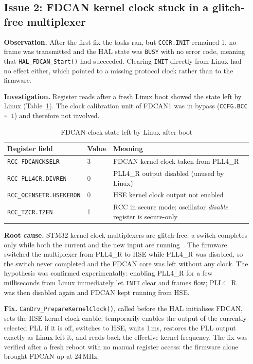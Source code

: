 \subsection{Issue 2: FDCAN kernel clock stuck in a glitch-free multiplexer}

\textbf{Observation.} After the first fix the tasks ran, but \texttt{CCCR.INIT} remained 1, no frame was transmitted and the HAL state was \texttt{BUSY} with no error code, meaning that \texttt{HAL\_FDCAN\_Start()} had succeeded. Clearing \texttt{INIT} directly from Linux had no effect either, which pointed to a missing protocol clock rather than to the firmware.

\textbf{Investigation.} Register reads after a fresh Linux boot showed the state left by Linux (Table~\ref{tab:clockstate}). The clock calibration unit of FDCAN1 was in bypass (\texttt{CCFG.BCC = 1}) and therefore not involved.

\begin{table}[H]
\centering
\small
\caption{FDCAN clock state left by Linux after boot}
\label{tab:clockstate}
\begin{tabularx}{\textwidth}{@{}llX@{}}
\toprule
\textbf{Register field} & \textbf{Value} & \textbf{Meaning} \\
\midrule
\texttt{RCC\_FDCANCKSELR} & 3 & FDCAN kernel clock taken from PLL4\_R \\
\texttt{RCC\_PLL4CR.DIVREN} & 0 & PLL4\_R output disabled (unused by Linux) \\
\texttt{RCC\_OCENSETR.HSEKERON} & 0 & HSE kernel clock output not enabled \\
\texttt{RCC\_TZCR.TZEN} & 1 & RCC in secure mode; oscillator \textit{disable} register is secure-only \\
\bottomrule
\end{tabularx}
\end{table}

\textbf{Root cause.} STM32 kernel clock multiplexers are glitch-free: a switch completes only while both the current and the new input are running~\cite{RM0436}. The firmware switched the multiplexer from PLL4\_R to HSE while PLL4\_R was disabled, so the switch never completed and the FDCAN core was left without any clock. The hypothesis was confirmed experimentally: enabling PLL4\_R for a few milliseconds from Linux immediately let \texttt{INIT} clear and frames flow; PLL4\_R was then disabled again and FDCAN kept running from HSE.

\textbf{Fix.} \texttt{CanDrv\_PrepareKernelClock()}, called before the HAL initialises FDCAN, sets the HSE kernel clock enable, temporarily enables the output of the currently selected PLL if it is off, switches to HSE, waits 1\,ms, restores the PLL output exactly as Linux left it, and reads back the effective kernel frequency. The fix was verified after a fresh reboot with no manual register access: the firmware alone brought FDCAN up at 24\,MHz.

